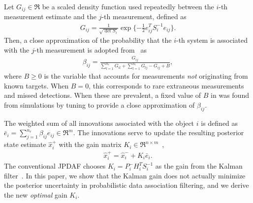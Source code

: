 Let $G_{ij}\in\Re$ be a scaled density function used repeatedly between the $i$-th measurement estimate and the $j$-th measurement, defined as
\begin{align}
G_{ij}=\frac1{\sqrt{\det{S_{i}}}}\exp{\{-\frac12e_{ij}^TS_{i}^{-1}e_{ij}\}}.
\end{align}
%
%
Then, a close approximation of the probability that the $i$-th system is associated with the $j$-th measurement is adopted from~\cite{Bar1990} as
\begin{align}
\label{eqn:betaDef}
\beta_{ij}=\frac{G_{ij}}{\sum\limits_{l=1}^{n_r}G_{il}+\sum\limits_{l=1}^{n_t}G_{lj}-G_{ij}+B},
\end{align}
where $B\geq0$ is the variable that accounts for measurements \emph{not} originating from known targets. When $B=0$, this corresponds to rare extraneous measurements and missed detections. 
When these are prevalent, a fixed value of $B$ in  was found from simulations by tuning to provide a close approximation of $\beta_{ij}$.%





The weighted sum of all innovations associated with the object $i$ is defined as ${\bar{e}}_{i}={\sum\limits_{j=1}^{n_r} \beta_{ij}e_{ij}}\in\Re^m$.
The innovations serve to update the resulting posterior state estimate $\hat x^+_{i}$ with the gain matrix $K_i\in\Re^{n\times m}$~\cite{TrackDataAssoc},
\begin{align}
\hat x^+_{i}= \hat x^-_{i}+K_{i}{\bar{e}}_{i}.\label{eqn:KalEst}
\end{align}
The conventional JPDAF chooses $K_i=P^-_iH_i^TS_i^{-1}$ as the gain from the Kalman filter~\cite{TrackDataAssoc}.
In this paper, we show that the Kalman gain does not actually minimize the posterior uncertainty in probabilistic data association filtering, and we derive the new \textit{optimal} gain $K_i$.

